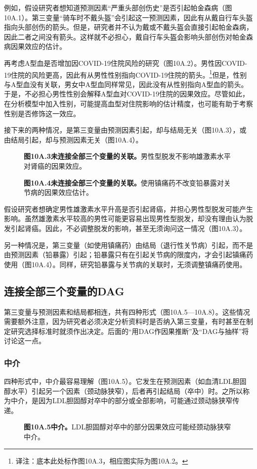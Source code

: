 例如，假设研究者想知道预测因素“严重头部创伤史”是否引起帕金森病（图10A.1）。第三变量“骑车时不戴头盔”会引起这一预测因素，因此有从戴自行车头盔指向头部创伤的箭头。但是，研究者并不认为戴或不戴头盔会直接引起帕金森病，因此二者之间没有箭头。这样就不必担心，戴自行车头盔会影响头部创伤对帕金森病因果效应的估计。

再考虑A型血是否增加因COVID-19住院风险的研究（图10A.2）。男性因COVID-19住院的风险更高，因此有从男性性别指向COVID-19住院的箭头。\footnote{译注：底本此处标作图10A.3，相应图实际为图10A.2。}但是，性别与A型血没有关联，男女中A型血同样常见，因此没有从性别指向A型血的箭头。于是，不必担心男性性别会解释A型血对COVID-19住院的因果效应。尽管如此，在分析模型中加入性别，可能提高血型对住院影响的估计精度，也可能有助于考察性别是否修饰这一效应。

接下来的两种情况，是第三变量由预测因素引起，却与结局无关（图10A.3），或由结局引起，却与预测因素无关（图10A.4）。
\par
\begin{figure}[htbp]\centering{}
\caption*{\textbf{图10A.3\quad 未连接全部三个变量的关联。}男性型脱发不影响雄激素水平对肾癌的因果效应。}
\end{figure}
\par
\par
\begin{figure}[htbp]\centering{}
\caption*{\textbf{图10A.4\quad 未连接全部三个变量的关联。}使用镇痛药不改变铅暴露对关节病的因果效应估计。}
\end{figure}
\par

假设研究者想确定男性雄激素水平升高是否引起肾癌，并担心男性型脱发可能产生影响。虽然雄激素水平较高的男性可能更容易出现男性型脱发，却没有理由认为脱发引起肾癌。因此，不必调整脱发的影响，甚至无须询问这一情况（图10A.3）。

另一种情况是，第三变量（如使用镇痛药）由结局（退行性关节病）引起，而不是由预测因素（铅暴露）引起；铅暴露只有在引起关节病的限度内，才会引起镇痛药使用（图10A.4）。同样，研究铅暴露与关节病的关联时，无须调整镇痛药使用。

\subsection{连接全部三个变量的DAG}
第三变量与预测因素和结局都相连，共有四种形式（图10A.5—10A.8）。这些情况需要额外注意，因为研究者必须决定分析资料时是否纳入第三变量，有时甚至在制定研究选择标准时就须作出决定。后面的“用DAG作因果推断”及“DAG与抽样”将讨论这一点。
\subsubsection{中介}
四种形式中，中介最容易理解（图10A.5）。它发生在预测因素（如血清LDL胆固醇水平）引起另一个因素（颈动脉狭窄），后者再引起结局（卒中）时。之所以称为中介，是因为LDL胆固醇对卒中的部分或全部影响，可能通过颈动脉狭窄传递。
\par
\begin{figure}[htbp]\centering{}
\caption*{\textbf{图10A.5\quad 中介。}LDL胆固醇对卒中的部分因果效应可能经颈动脉狭窄中介。}
\end{figure}
\par
